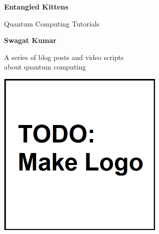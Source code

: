 \documentclass[12pt,openany,oneside]{book}
\begin{document}
    { \let\cleardoublepage\clearpage
    \begin{titlepage}
        \begin{center}
            \vspace*{1.5cm}

            \Huge
            \textbf{Entangled Kittens}

            \vspace{0.5cm}
            \LARGE
            Quantum Computing Tutorials

            \vspace{1.5cm}

            \textbf{Swagat Kumar}

            \vspace{0.4cm}

            A series of blog posts and video scripts\\
            about quantum computing
            \vspace{1.6cm}

            \includegraphics[width=0.6\textwidth]{logo.png}
            
            \thispagestyle{empty}
        \end{center}
    \end{titlepage}
    \frontmatter
    \tableofcontents
    }
    \mainmatter
    
\end{document}
